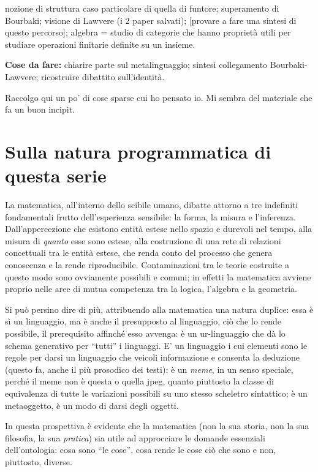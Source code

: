 \documentclass[a4paper, 11pt]{article}
\begin{document}
nozione di struttura caso particolare di quella di funtore; superamento di Bourbaki; visione di Lawvere (i 2 paper salvati); [provare a fare una sintesi di questo percorso]; algebra = studio di categorie che hanno proprietà utili per studiare operazioni finitarie definite su un insieme. 

\textbf{Cose da fare:} chiarire parte sul metalinguaggio; sintesi collegamento Bourbaki-Lawvere; ricostruire dibattito sull'identità.  


\newpage

Raccolgo qui un po' di cose sparse cui ho pensato io. Mi sembra del materiale che fa un buon incipit.

\section{Sulla natura programmatica di questa serie}
La matematica, all'interno dello scibile umano, dibatte attorno a tre indefiniti fondamentali frutto dell'esperienza sensibile: la forma, la misura e l'inferenza. Dall'appercezione che esistono entità estese nello spazio e durevoli nel tempo, alla misura di \emph{quanto} esse sono estese, alla costruzione di una rete di relazioni concettuali tra le entità estese, che renda conto del processo che genera conoscenza e la rende riproducibile. Contaminazioni tra le teorie costruite a questo modo sono ovviamente possibili e comuni; in effetti la matematica avviene proprio nelle aree di mutua competenza tra la logica, l'algebra e la geometria. 

Si può persino dire di più, attribuendo alla matematica una natura duplice: essa è sì un linguaggio, ma è anche il presupposto al linguaggio, ciò che lo rende possibile, il prerequisito affinché esso avvenga: è un ur-linguaggio che dà lo schema generativo per ``tutti'' i linguaggi. E' un linguaggio i cui elementi sono le regole per darsi un linguaggio che veicoli informazione e consenta la deduzione (questo fa, anche il più prosodico dei testi): è un \emph{meme}, in un senso speciale, perché il meme non è questa o quella jpeg, quanto piuttosto la classe di equivalenza di tutte le variazioni possibili su uno stesso scheletro sintattico; è un metaoggetto, è un modo di darsi degli oggetti.

In questa prospettiva è evidente che la matematica (non la sua storia, non la sua filosofia, la sua \emph{pratica}) sia utile ad approcciare le domande essenziali dell'ontologia: cosa sono ``le cose'', cosa rende le cose ciò che sono e non, piuttosto, diverse.
\end{document}
